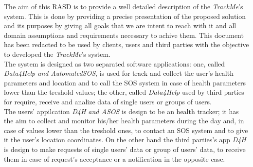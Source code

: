 The aim of this RASD is to provide a well detailed description of the \textit{TrackMe}'s system.
This is done by providing a precise presentation of the proposed solution and its purposes by giving all goals that we are intent to reach with it and all domain assumptions and requirements necessary to achive them.
This document has been redacted to be used by clients, users and third parties with the objective to developed the \textit{TrackMe}'s system.\vspace{0.5cm}\\The system is designed as two separated software applications: one, called \textit{Data4Help and AutomatedSOS}, is used for track and collect the user's health parameters and location and to call the SOS system in case of health parameters lower than the treshold values; the other, called \textit{Data4Help} used by third parties for require, receive and analize data of single users or groups of users.\\
The users' appilcation \textit{D4H and ASOS} is design to be an health tracker; it has the aim to collect and monitor his/her health parameters during the day and, in case of values lower than the treshold ones, to contact an SOS system and to give it the user's location coordinates. On the other hand the third parties's app \textit{D4H} is design to make requests of single users' data or group of users' data, to receive them in case of request's acceptance or a notification in the opposite case.